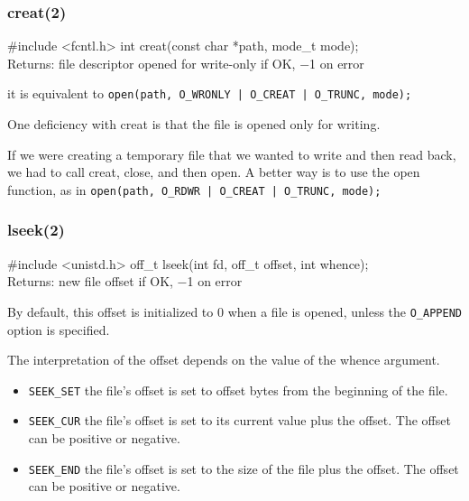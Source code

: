\documentclass[newPxFont,sthlmFooter,nooffset]{beamer}
\begin{document}
\begin{frame}[containsverbatim,t]
  \frametitle{creat(2)}

\begin{codedef}
#include <fcntl.h>
int creat(const char *path, mode_t mode);  \\ Returns: file descriptor opened for write-only if OK, −1 on error
\end{codedef}
\bigskip

it is equivalent to \texttt{open(path, O\_WRONLY | O\_CREAT | O\_TRUNC, mode);}
\bigskip

One deficiency with creat is that the file is opened only for writing.
\bigskip

If we were creating a temporary file that we wanted to write and then read back, we had to call creat, close, and then open. A better way is to use the open function, as in
\texttt{open(path, O\_RDWR | O\_CREAT | O\_TRUNC, mode);}

\end{frame}



\begin{frame}[containsverbatim,t]
  \frametitle{lseek(2)}
\begin{codedef}
#include <unistd.h>
off_t lseek(int fd, off_t offset, int whence);  \\ Returns: new file offset if OK, −1 on error
\end{codedef}
By default, this offset is initialized to 0 when a file is opened, unless the \texttt{O\_APPEND} option is specified.
\bigskip

The interpretation of the offset depends on the value of the whence argument.
\begin{itemize}
\item \texttt{SEEK\_SET} the file’s offset is set to offset bytes from the beginning of the file.
\item \texttt{SEEK\_CUR} the file’s offset is set to its current value plus the offset. The offset can be positive or negative.
\item \texttt{SEEK\_END} the  file’s offset is set to the size of the file plus the offset. The offset can be positive or negative.
\end{itemize}

\end{frame}
\end{document}
